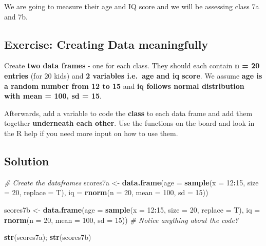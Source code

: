 \documentclass[
]{book}
\newenvironment{Shaded}{\begin{snugshade}}{\end{snugshade}}
\newcommand{\AttributeTok}[1]{\textcolor[rgb]{0.13,0.29,0.53}{#1}}
\newcommand{\CommentTok}[1]{\textcolor[rgb]{0.56,0.35,0.01}{\textit{#1}}}
\newcommand{\DecValTok}[1]{\textcolor[rgb]{0.00,0.00,0.81}{#1}}
\newcommand{\FunctionTok}[1]{\textcolor[rgb]{0.13,0.29,0.53}{\textbf{#1}}}
\newcommand{\NormalTok}[1]{#1}
\newcommand{\OtherTok}[1]{\textcolor[rgb]{0.56,0.35,0.01}{#1}}
\newcommand{\SpecialCharTok}[1]{\textcolor[rgb]{0.81,0.36,0.00}{\textbf{#1}}}
\begin{document}
We are going to measure their age and IQ score and we will be assessing class 7a and 7b.

\subsection{Exercise: Creating Data meaningfully}\label{exercise-creating-data-meaningfully}

Create \textbf{two data frames} - one for each class.
They should each contain \textbf{n = 20 entries} (for 20 kids) and \textbf{2 variables i.e.~age and iq score}.
We assume \textbf{age is a random number from 12 to 15} and \textbf{iq follows normal distribution with mean = 100, sd = 15}.

Afterwards, add a variable to code the \textbf{class} to each data frame and add them together \textbf{underneath each other}.
Use the functions on the board and look in the R help if you need more input on how to use them.

\subsection{Solution}\label{solution-2}

\begin{Shaded}
\begin{Highlighting}[]
\CommentTok{\# Create the dataframes}
\NormalTok{scores7a }\OtherTok{\textless{}{-}} \FunctionTok{data.frame}\NormalTok{(}\AttributeTok{age =} \FunctionTok{sample}\NormalTok{(}\AttributeTok{x =} \DecValTok{12}\SpecialCharTok{:}\DecValTok{15}\NormalTok{, }\AttributeTok{size =} \DecValTok{20}\NormalTok{, }\AttributeTok{replace =}\NormalTok{ T),}
                       \AttributeTok{iq =} \FunctionTok{rnorm}\NormalTok{(}\AttributeTok{n =} \DecValTok{20}\NormalTok{, }\AttributeTok{mean =} \DecValTok{100}\NormalTok{, }\AttributeTok{sd =} \DecValTok{15}\NormalTok{))}

\NormalTok{scores7b }\OtherTok{\textless{}{-}} \FunctionTok{data.frame}\NormalTok{(}\AttributeTok{age =} \FunctionTok{sample}\NormalTok{(}\AttributeTok{x =} \DecValTok{12}\SpecialCharTok{:}\DecValTok{15}\NormalTok{, }\AttributeTok{size =} \DecValTok{20}\NormalTok{, }\AttributeTok{replace =}\NormalTok{ T),}
                       \AttributeTok{iq =} \FunctionTok{rnorm}\NormalTok{(}\AttributeTok{n =} \DecValTok{20}\NormalTok{, }\AttributeTok{mean =} \DecValTok{100}\NormalTok{, }\AttributeTok{sd =} \DecValTok{15}\NormalTok{))}
\CommentTok{\# Notice anything about the code?}

\FunctionTok{str}\NormalTok{(scores7a); }\FunctionTok{str}\NormalTok{(scores7b)}
\end{Highlighting}
\end{Shaded}
\end{document}
